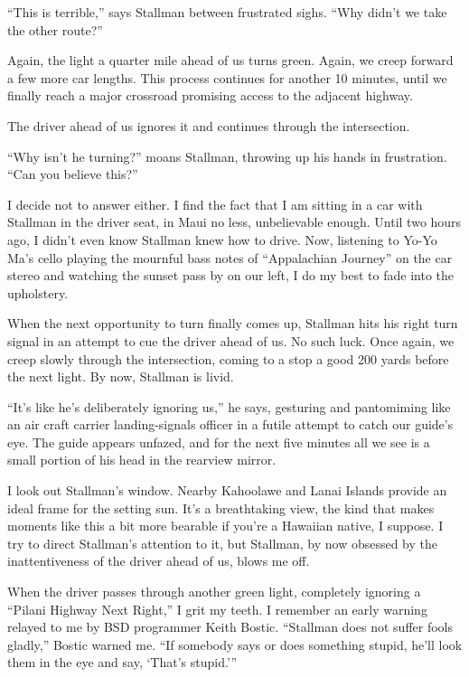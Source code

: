 ``This is terrible,'' says Stallman between frustrated sighs. ``Why didn't we take the other route?''

Again, the light a quarter mile ahead of us turns green. Again, we creep forward a few more car lengths. This process continues for another 10 minutes, until we finally reach a major crossroad promising access to the adjacent highway.

The driver ahead of us ignores it and continues through the intersection.

``Why isn't he turning?'' moans Stallman, throwing up his hands in frustration. ``Can you believe this?''

I decide not to answer either. I find the fact that I am sitting in a car with Stallman in the driver seat, in Maui no less, unbelievable enough. Until two hours ago, I didn't even know Stallman knew how to drive. Now, listening to Yo-Yo Ma's cello playing the mournful bass notes of ``Appalachian Journey'' on the car stereo and watching the sunset pass by on our left, I do my best to fade into the upholstery.

When the next opportunity to turn finally comes up, Stallman hits his right turn signal in an attempt to cue the driver ahead of us. No such luck. Once again, we creep slowly through the intersection, coming to a stop a good 200 yards before the next light. By now, Stallman is livid.

``It's like he's deliberately ignoring us,'' he says, gesturing and pantomiming like an air craft carrier landing-signals officer in a futile attempt to catch our guide's eye. The guide appears unfazed, and for the next five minutes all we see is a small portion of his head in the rearview mirror.

I look out Stallman's window. Nearby Kahoolawe and Lanai Islands provide an ideal frame for the setting sun. It's a breathtaking view, the kind that makes moments like this a bit more bearable if you're a Hawaiian native, I suppose. I try to direct Stallman's attention to it, but Stallman, by now obsessed by the inattentiveness of the driver ahead of us, blows me off.

When the driver passes through another green light, completely ignoring a ``Pilani Highway Next Right,'' I grit my teeth. I remember an early warning relayed to me by BSD programmer Keith Bostic. ``Stallman does not suffer fools gladly,'' Bostic warned me. ``If somebody says or does something stupid, he'll look them in the eye and say, `That's stupid.'\hspace{0.01in}''


